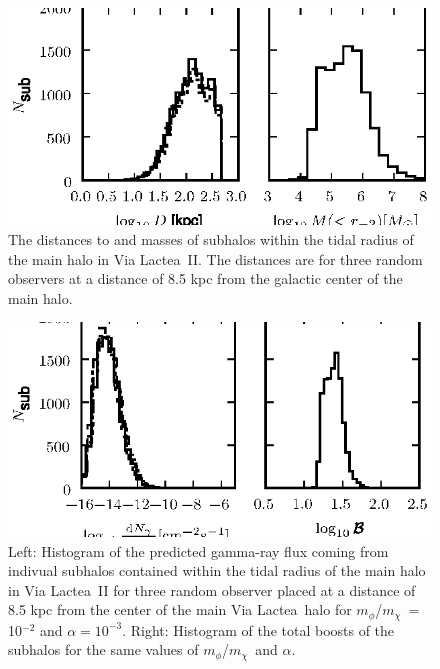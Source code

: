 \documentclass[aps,prd,twocolumn,amsmath,amssymb,floatfix,nofootinbib,10pt]{revtex4}
\newcommand{\VL}{Via Lactea}
\newcommand{\mdm}{\ensuremath{m_{\chi}}}
\newcommand{\mv}{\ensuremath{m_{\phi}}}
\begin{document}
\begin{figure}
\centering
\includegraphics{hist_-2_-3_10_1.eps}
\caption{The distances to and masses of subhalos within the tidal
radius of the main halo in \VL\ II. The distances are for three random
observers at a distance of 8.5 kpc from the galactic center of the
main halo.}%
\label{fig:VL23_1}%
\end{figure}






\begin{figure}
\centering
\includegraphics{hist_-2_-3_10_2.eps}
\caption{Left: Histogram of the predicted gamma-ray flux coming from
indivual subhalos contained within the tidal radius of the main halo
in \VL\ II for three random observer placed at a distance of 8.5 kpc
from the center of the main \VL\ halo for \mv/\mdm\ = 10$^{-2}$ and
$\alpha = 10^{-3}$. Right: Histogram of the total boosts of the
subhalos for the same values of \mv/\mdm\ and $\alpha$.}%
\label{fig:VL23_2}%
\end{figure}
\end{document}
